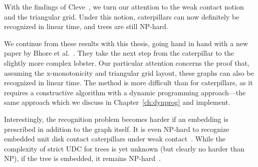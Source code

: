 With the findings of Cleve~\cite{Cleve2020}, we turn our attention to the weak contact notion and the triangular grid. Under this notion, caterpillars can now definitely be recognized in linear time, and trees are still NP-hard.

We continue from these results with this thesis, going hand in hand with a new paper by Bhore et al.~\cite{Bhore2021}. They take the next step from the caterpillar to the slightly more complex lobster. Our particular attention concerns the proof that, assuming the x-monotonicity and triangular grid layout, these graphs can also be recognized in linear time. The method is more difficult than for caterpillars, as it requires a constructive algorithm with a dynamic programming approach---the same approach which we discuss in Chapter~\ref{ch:dynprog} and implement.

Interestingly, the recognition problem becomes harder if an embedding is prescribed in addition to the graph itself. It is even NP-hard to recognize embedded unit disk contact caterpillars under weak contact~\cite{Chiu2019}. While the complexity of strict UDC for trees is yet unknown (but clearly no harder than NP), if the tree is embedded, it remains NP-hard~\cite{Bowen2015}.
